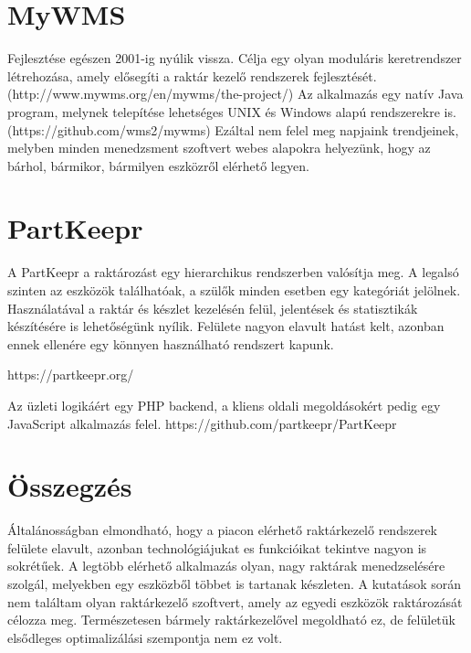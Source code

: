 \section{MyWMS}
Fejlesztése egészen 2001-ig nyúlik vissza. Célja egy olyan moduláris keretrendszer létrehozása, amely elősegíti a raktár kezelő rendszerek fejlesztését. (http://www.mywms.org/en/mywms/the-project/)
Az alkalmazás egy natív Java program, melynek telepítése lehetséges UNIX és Windows alapú rendszerekre is. (https://github.com/wms2/mywms)
Ezáltal nem felel meg napjaink trendjeinek, melyben minden menedzsment szoftvert webes alapokra helyezünk, hogy az bárhol, bármikor, bármilyen eszközről elérhető legyen.



\section{PartKeepr}
A PartKeepr a raktározást egy hierarchikus rendszerben valósítja meg. A legalsó szinten az eszközök találhatóak, a szülők minden esetben egy kategóriát jelölnek. Használatával a raktár és készlet kezelésén felül, jelentések és statisztikák készítésére is lehetőségünk nyílik. Felülete nagyon elavult hatást kelt, azonban ennek ellenére egy könnyen használható rendszert kapunk.

https://partkeepr.org/

Az üzleti logikáért egy PHP backend, a kliens oldali megoldásokért pedig egy JavaScript alkalmazás felel.
https://github.com/partkeepr/PartKeepr


\section{Összegzés}
Általánosságban elmondható, hogy a piacon elérhető raktárkezelő rendszerek felülete elavult, azonban technológiájukat es funkcióikat tekintve nagyon is sokrétűek. A legtöbb elérhető alkalmazás olyan, nagy raktárak menedzselésére szolgál, melyekben egy eszközből többet is tartanak készleten. A kutatások során nem találtam olyan raktárkezelő szoftvert, amely az egyedi eszközök raktározását célozza meg. Természetesen bármely raktárkezelővel megoldható ez, de felületük elsődleges optimalizálási szempontja nem ez volt.

